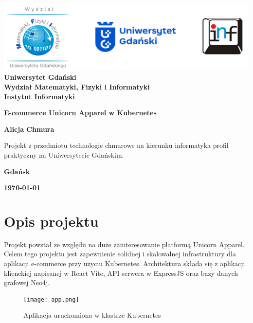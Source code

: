 \documentclass[12pt,a4paper]{article}
\newcommand{\hmwkTitle}{E-commerce Unicorn Apparel w Kubernetes} %
\newcommand{\hmwkDueDate}{\today} %
\newcommand{\hmwkAuthorName}{Alicja Chmura} %
\begin{document}
\begin{titlepage}
    \vfill
	\begin{center}
	\hspace*{-1cm}
	\vspace*{0.5cm}
    \includegraphics[scale=0.55]{imagens/loga.png}\\
	\textbf{Uniwersytet Gdański \\ [0.05cm]Wydział Matematyki, Fizyki i Informatyki \\ [0.05cm] Instytut Informatyki}

	\vspace{0.6cm}
	\vspace{4cm}
	{\huge \textbf{\hmwkTitle}}\vspace{8mm}
	
	{\large \textbf{\hmwkAuthorName}}\\[3cm]
	
		\hspace{.45\textwidth} %
	   \begin{minipage}{.5\textwidth}
	   Projekt z przedmiotu technologie chmurowe na kierunku informatyka profil praktyczny na Uniwersytecie Gdańskim.\\[0.1cm]
	  \end{minipage}
	  \vfill
	
	\textbf{Gdańsk}
	
	\textbf{\hmwkDueDate}
	\end{center}
	
\end{titlepage}

\newpage
\setcounter{secnumdepth}{5}
\tableofcontents
\newpage

\section{Opis projektu}
\label{sec:Project}

Projekt powstał ze względu na duże zainteresowanie platformą Unicorn Apparel. Celem tego projektu jest zapewnienie solidnej i skalowalnej infrastruktury dla aplikacji e-commerce przy użyciu Kubernetes. Architektura składa się z aplikacji klienckiej napisanej w React Vite, API serwera w ExpressJS oraz bazy danych grafowej Neo4j.
\begin{figure}[htbp]
    \centering
    \texttt{[image: app.png]}
    \caption{Aplikacja uruchomiona w klastrze Kubernetes}
\end{figure}
\end{document}
